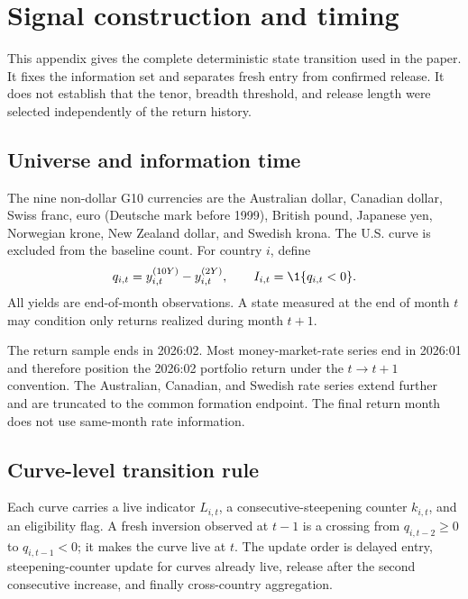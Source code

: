 \section{Signal construction and timing}
\label{app:signal}

This appendix gives the complete deterministic state transition used in the paper. It fixes the information set and separates fresh entry from confirmed release. It does not establish that the tenor, breadth threshold, and release length were selected independently of the return history.

\subsection{Universe and information time}

The nine non-dollar G10 currencies are the Australian dollar, Canadian dollar, Swiss franc, euro (Deutsche mark before 1999), British pound, Japanese yen, Norwegian krone, New Zealand dollar, and Swedish krona. The U.S. curve is excluded from the baseline count. For country $i$, define
\[
q_{i,t}=y_{i,t}^{(10Y)}-y_{i,t}^{(2Y)},
\qquad
I_{i,t}=\1\{q_{i,t}<0\}.
\]
All yields are end-of-month observations. A state measured at the end of month $t$ may condition only returns realized during month $t+1$.

The return sample ends in 2026:02. Most money-market-rate series end in 2026:01 and therefore position the 2026:02 portfolio return under the $t\rightarrow t+1$ convention. The Australian, Canadian, and Swedish rate series extend further and are truncated to the common formation endpoint. The final return month does not use same-month rate information.

\subsection{Curve-level transition rule}

Each curve carries a live indicator $L_{i,t}$, a consecutive-steepening counter $k_{i,t}$, and an eligibility flag. A fresh inversion observed at $t-1$ is a crossing from $q_{i,t-2}\geq0$ to $q_{i,t-1}<0$; it makes the curve live at $t$. The update order is delayed entry, steepening-counter update for curves already live, release after the second consecutive increase, and finally cross-country aggregation.

